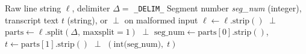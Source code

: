 \documentclass[12pt,a4paper]{article}
\theoremstyle{plain}
\theoremstyle{definition}
\begin{document}
\begin{algorithm}[H]
\caption{Parse a Single \texttt{.annotprocessed} Line}
\label{alg:parse_line}
\begin{algorithmic}[1]
\Require Raw line string $\ell$, delimiter $\Delta = $ \texttt{\_DELIM\_}
\Ensure  Segment number \textit{seg\_num} (integer),
         transcript text $t$ (string), or $\perp$ on malformed input
\State $\ell \gets \ell.\text{strip}()$
  \State \Return $\perp$
\EndIf
\State $\text{parts} \gets \ell.\text{split}(\Delta,\, \text{maxsplit}=1)$
  \State \Return $\perp$
\EndIf
\State $\text{seg\_num} \gets \text{parts}[0].\text{strip}()$,\quad
       $t \gets \text{parts}[1].\text{strip}()$
  \State \Return $\perp$
\EndIf
\State \Return $(\text{int(seg\_num)},\; t)$
\end{algorithmic}
\end{algorithm}
\end{document}
